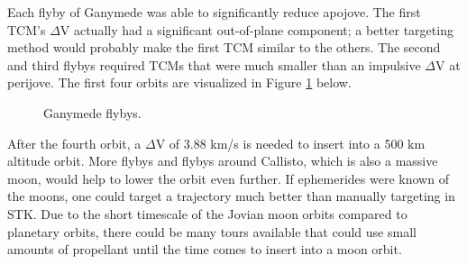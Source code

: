 \documentclass[]{aiaa-tc}%
\begin{document}
Each flyby of Ganymede was able to significantly reduce apojove. The first TCM's $\Delta$V actually had a significant out-of-plane component; a better targeting method would probably make the first TCM similar to the others. The second and third flybys required TCMs that were much smaller than an impulsive $\Delta$V at perijove. The first four orbits are visualized in Figure \ref{fig:FlybyOrbs} below.
	\begin{figure}[H]
		\centering
		\caption{Ganymede flybys. }
		\label{fig:FlybyOrbs}
	\end{figure}	

After the fourth orbit, a $\Delta$V of 3.88 km/s is needed to insert into a 500 km altitude orbit. More flybys and flybys around Callisto, which is also a massive moon, would help to lower the orbit even further. If ephemerides were known of the moons, one could target a trajectory much better than manually targeting in STK. Due to the short timescale of the Jovian moon orbits compared to planetary orbits, there could be many tours available that could use small amounts of propellant until the time comes to insert into a moon orbit.
\end{document}
